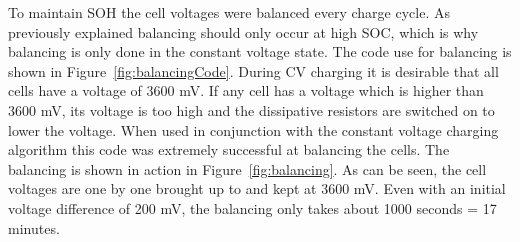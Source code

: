 \documentclass[a4paper]{article}
\begin{document}
To maintain SOH the cell voltages were balanced every charge cycle. 
As previously explained balancing should only occur at high SOC, 
which is why balancing is only done in the constant voltage state. 
The code use for balancing is shown in Figure~\ref{fig:balancingCode}. 
During CV charging it is desirable that all cells have a voltage of 
3600 mV. If any cell has a voltage which is higher than 3600 mV, 
its voltage is too high and the dissipative resistors are switched 
on to lower the voltage. When used in conjunction with the constant 
voltage charging algorithm this code was extremely successful at 
balancing the cells. The balancing is shown in action in 
Figure~\ref{fig:balancing}. As can be seen, the cell voltages are 
one by one brought up to and kept at 3600 mV. Even with an initial 
voltage difference of 200 mV, the balancing only takes about 
1000 seconds = 17 minutes. 
 
\end{document}
